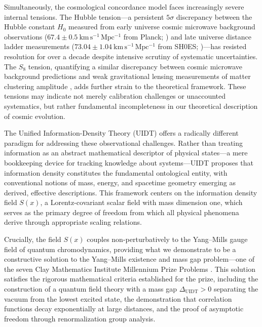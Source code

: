 Simultaneously, the cosmological concordance model faces increasingly severe internal tensions. The Hubble tension—a persistent $5\sigma$ discrepancy between the Hubble constant $H_0$ measured from early universe cosmic microwave background observations ($67.4 \pm 0.5~\mathrm{km\,s^{-1}\,Mpc^{-1}}$ from Planck; \citealt{Planck2020}) and late universe distance ladder measurements ($73.04 \pm 1.04~\mathrm{km\,s^{-1}\,Mpc^{-1}}$ from SH0ES; \citealt{Riess2022})—has resisted resolution for over a decade despite intensive scrutiny of systematic uncertainties. The $S_8$ tension, quantifying a similar discrepancy between cosmic microwave background predictions and weak gravitational lensing measurements of matter clustering amplitude \citep{Heymans2021,DES2021,Hikage2019}, adds further strain to the theoretical framework. These tensions may indicate not merely calibration challenges or unaccounted systematics, but rather fundamental incompleteness in our theoretical description of cosmic evolution.

The Unified Information-Density Theory (UIDT) offers a radically different paradigm for addressing these observational challenges. Rather than treating information as an abstract mathematical descriptor of physical states—a mere bookkeeping device for tracking knowledge about systems—UIDT proposes that information density constitutes the fundamental ontological entity, with conventional notions of mass, energy, and spacetime geometry emerging as derived, effective descriptions. This framework centers on the information density field $S(x)$, a Lorentz-covariant scalar field with mass dimension one, which serves as the primary degree of freedom from which all physical phenomena derive through appropriate scaling relations.

Crucially, the field $S(x)$ couples non-perturbatively to the Yang--Mills gauge field of quantum chromodynamics, providing what we demonstrate to be a constructive solution to the Yang--Mills existence and mass gap problem—one of the seven Clay Mathematics Institute Millennium Prize Problems \citep{MillenniumPrize}. This solution satisfies the rigorous mathematical criteria established for the prize, including the construction of a quantum field theory with a mass gap $\Delta_{\mathrm{UIDT}} > 0$ separating the vacuum from the lowest excited state, the demonstration that correlation functions decay exponentially at large distances, and the proof of asymptotic freedom through renormalization group analysis.

